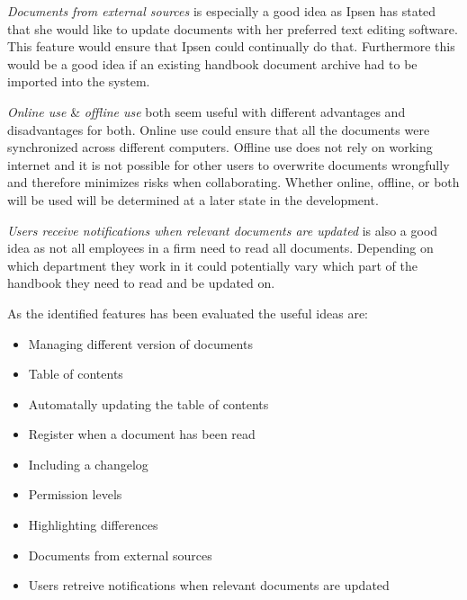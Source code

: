 \textit{Documents from external sources} is especially a good idea as Ipsen has stated that she would like to update documents with her preferred text editing software.
This feature would ensure that Ipsen could continually do that.
Furthermore this would be a good idea if an existing handbook document archive had to be imported into the system.

\textit{Online use} \& \textit{offline use} both seem useful with different advantages and disadvantages for both.
Online use could ensure that all the documents were synchronized across different computers.
Offline use does not rely on working internet and it is not possible for other users to overwrite documents wrongfully and therefore minimizes risks when collaborating.
Whether online, offline, or both will be used will be determined at a later state in the development.

\textit{Users receive notifications when relevant documents are updated} is also a good idea as not all employees in a firm need to read all documents.
Depending on which department they work in it could potentially vary which part of the handbook they need to read and be updated on.

As the identified features has been evaluated the useful ideas are:
\begin{itemize}
	\item Managing different version of documents
	\item Table of contents
	\item Automatally updating the table of contents
	\item Register when a document has been read
	\item Including a changelog
	\item Permission levels
	\item Highlighting differences
	\item Documents from external sources
	\item Users retreive notifications when relevant documents are updated
\end{itemize}

